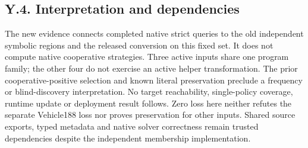 \subsection*{Y.4. Interpretation and dependencies}
The new evidence connects completed native strict queries to the old
independent symbolic regions and the released conversion on this fixed
set. It does not compute native cooperative strategies. Three active
inputs share one program family; the other four do not exercise an active
helper transformation. The prior cooperative-positive selection and
known literal preservation preclude a frequency or blind-discovery
interpretation. No target reachability, single-policy coverage, runtime
update or deployment result follows. Zero loss here neither refutes the
separate Vehicle188 loss nor proves preservation for other inputs.
Shared source exports, typed metadata and native solver correctness remain
trusted dependencies despite the independent membership implementation.
